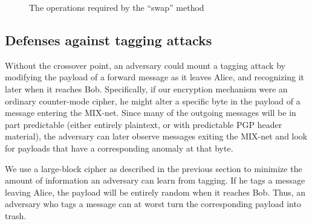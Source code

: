 \documentclass[11pt]{IEEEtran}
\begin{document}
\begin{figure}
\begin{center}
\caption{The operations required by the ``swap'' method} 
\end{center}
\end{figure}


\subsection{Defenses against tagging attacks}
\label{subsec:tagging-defenses}

Without the crossover point, an adversary could mount a tagging
attack by modifying the payload of a forward message as
it leaves Alice, and recognizing it later when it reaches Bob.
Specifically, if our encryption mechanism were an ordinary
counter-mode cipher, he might alter a specific byte in the payload of
a message entering the MIX-net. Since many of the outgoing messages
will be in part predictable (either entirely plaintext, or with
predictable PGP header material), the adversary can later observe
messages exiting the MIX-net and look for payloads that have a
corresponding anomaly at that byte.


We use a large-block cipher as described in the previous section to
minimize the amount of information an adversary can learn from tagging.
If he tags a message
leaving Alice, the payload will be entirely random when it reaches
Bob.  Thus, an adversary who tags a message can at worst turn the
corresponding payload into trash.  
\end{document}
